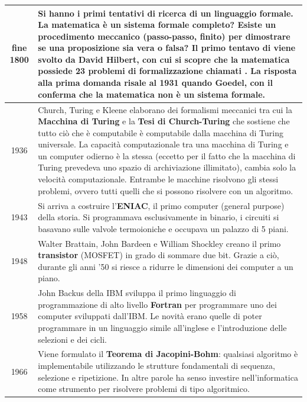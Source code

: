 \documentclass[a4paper]{article}
\begin{document}
\begin{center}
	\begin{tabularx}{\textwidth}{c X}
		fine 1800
		& Si hanno i primi tentativi di \textbf{ricerca di un linguaggio formale}. La matematica è un sistema formale
		completo? Esiste un procedimento meccanico (passo-passo, finito) per dimostrare se una proposizione sia vera
		o falsa? Il primo tentavo di \textit{\say{formalizzazione della matematica}} viene svolto da David Hilbert, con
		cui si scopre che la matematica possiede 23 problemi di formalizzazione chiamati \textit{\say{23 problemi di Hilbert}}.
		La risposta alla prima domanda risale al 1931 quando Goedel, con il \textit{\say{teorema di incompletezza}}
		conferma che la matematica non è un sistema formale. \\
		\midrule
		
		1936
		& Church, Turing e Kleene elaborano dei formalismi meccanici tra cui la \textbf{Macchina di Turing} e la
		\textbf{Tesi di Church-Turing} che sostiene che tutto ciò che è computabile è computabile dalla macchina di
		Turing universale. La capacità computazionale tra una macchina di Turing e un computer odierno è la stessa
		(eccetto per il fatto che la macchina di Turing prevedeva uno spazio di archiviazione illimitato), cambia
		solo la velocità computazionale. Entrambe le macchine risolvono gli stessi problemi, ovvero tutti quelli
		che si possono risolvere con un algoritmo. \\
		\midrule
		
		1943
		& Si arriva a costruire l'\textbf{ENIAC}, il primo computer (general purpose) della storia. Si programmava
		esclusivamente in binario, i circuiti si basavano sulle valvole termoioniche e occupava un palazzo di 5 piani. \\
		\midrule
		
		1948
		& Walter Brattain, John Bardeen e William Shockley creano il primo \textbf{transistor} (MOSFET) in grado di
		sommare due bit. Grazie a ciò, durante gli anni '50 si riesce a ridurre le dimensioni dei computer a un piano. \\
		\midrule
		
		1958
		& John Backus della IBM sviluppa il primo linguaggio di programmazione di alto livello \textbf{Fortran} per
		programmare uno dei computer sviluppati dall'IBM. Le novità erano quelle di poter programmare in un linguaggio
		simile all'inglese e l'introduzione delle selezioni e dei cicli. \\
		\midrule

		1966
		& Viene formulato il \textbf{Teorema di Jacopini-Bohm}: qualsiasi algoritmo è implementabile utilizzando le
		strutture fondamentali di sequenza, selezione e ripetizione. In altre parole ha senso investire nell'informatica 
		come strumento per risolvere problemi di tipo algoritmico. \\
		\midrule
		

\end{tabularx}
\end{center}
\end{document}
